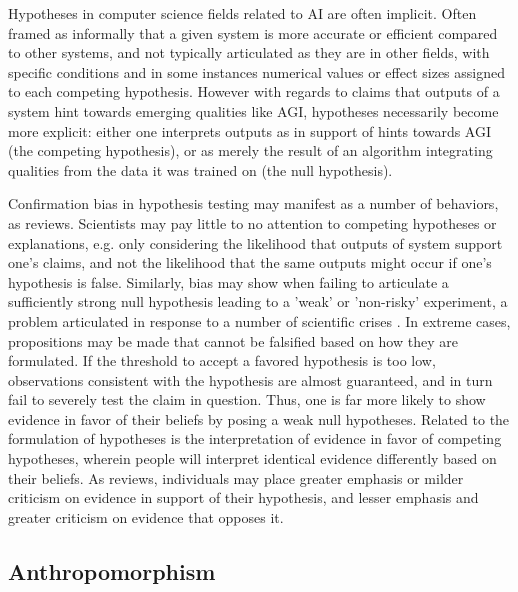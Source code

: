 \documentclass{article}
\theoremstyle{plain}
\theoremstyle{definition}
\theoremstyle{remark}
\begin{document}
Hypotheses in computer science fields related to AI are often implicit. Often framed as informally that a given system is more accurate or efficient compared to other systems, and not typically articulated as they are in other fields, with specific conditions and in some instances numerical values or effect sizes assigned to each competing hypothesis. However with regards to claims that outputs of a system hint towards emerging qualities like AGI, hypotheses necessarily become more explicit: either one interprets outputs as in support of hints towards AGI (the competing hypothesis), or as merely the result of an algorithm integrating qualities from the data it was trained on (the null hypothesis). 

Confirmation bias in hypothesis testing may manifest as a number of behaviors, as \cite{nickerson1998confirmation} reviews. Scientists may pay little to no attention to competing hypotheses or explanations, e.g. only considering the likelihood that outputs of system support one's claims, and not the likelihood that the same outputs might occur if one's hypothesis is false. Similarly, bias may show when failing to articulate a sufficiently strong null hypothesis leading to a 'weak' or 'non-risky' experiment, a problem articulated in response to a number of scientific crises \cite{claesen2022severity}. In extreme cases, propositions may be made that cannot be falsified based on how they are formulated. If the threshold to accept a favored hypothesis is too low, observations consistent with the hypothesis are almost guaranteed, and in turn fail to severely test the claim in question. Thus, one is far more likely to show evidence in favor of their beliefs by posing a weak null hypotheses. Related to the formulation of hypotheses is the interpretation of evidence in favor of competing hypotheses, wherein people will interpret identical evidence differently based on their beliefs. As \cite{nickerson1998confirmation} reviews, individuals may place greater emphasis or milder criticism on evidence in support of their hypothesis, and lesser emphasis and greater criticism on evidence that opposes it. 



\subsection{Anthropomorphism}
\end{document}
